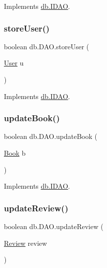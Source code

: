 Implements \hyperlink{interfacedb_1_1_i_d_a_o_a39851dc1e1f05af40afeb76a5f8be99a}{db.\+I\+D\+AO}.

\mbox{\label{classdb_1_1_d_a_o_a1600c5d7d28eb225fc7c244fdfb16150}} 
\subsubsection{\texorpdfstring{store\+User()}{storeUser()}}
{\footnotesize\ttfamily boolean db.\+D\+A\+O.\+store\+User (\begin{DoxyParamCaption}\item[{\hyperlink{classserver_1_1data_1_1_user}{User}}]{u }\end{DoxyParamCaption})}



Implements \hyperlink{interfacedb_1_1_i_d_a_o_a5b1f408c9a25305e977e962faa38b026}{db.\+I\+D\+AO}.

\mbox{\label{classdb_1_1_d_a_o_a4ea10c177ef93a3084ed74b38556adca}} 
\subsubsection{\texorpdfstring{update\+Book()}{updateBook()}}
{\footnotesize\ttfamily boolean db.\+D\+A\+O.\+update\+Book (\begin{DoxyParamCaption}\item[{\hyperlink{classserver_1_1data_1_1_book}{Book}}]{b }\end{DoxyParamCaption})}



Implements \hyperlink{interfacedb_1_1_i_d_a_o_a202354d7a3e1231687d543e82c15a6f5}{db.\+I\+D\+AO}.

\mbox{\label{classdb_1_1_d_a_o_ab73940ac7600902ea7d52bcd041a9c6e}} 
\subsubsection{\texorpdfstring{update\+Review()}{updateReview()}}
{\footnotesize\ttfamily boolean db.\+D\+A\+O.\+update\+Review (\begin{DoxyParamCaption}\item[{\hyperlink{classserver_1_1data_1_1_review}{Review}}]{review }\end{DoxyParamCaption})}



